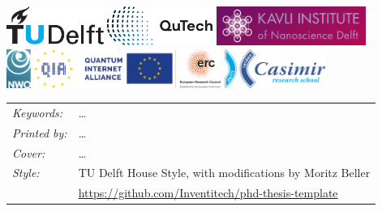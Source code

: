 \begin{titlepage}
\begin{center}
\noindent
\includegraphics[height=0.5in]{figures/logos/tudelft.pdf}
\hfill
\includegraphics[height=0.5in]{figures/logos/qutech.pdf}
\hfill
\includegraphics[height=0.5in]{figures/logos/kavli.pdf}
\\ \vspace{2\baselineskip}
\includegraphics[height=0.5in]{figures/logos/nwo.pdf}
\hfill
\includegraphics[height=0.5in]{figures/logos/qia.pdf}
\hfill
\includegraphics[height=0.5in]{figures/logos/erc.pdf}
\hfill
\includegraphics[height=0.5in]{figures/logos/casimir.pdf}
\end{center}

\vfill

\noindent
\begin{tabular}{@{}p{}@{}p{}}
    \textit{Keywords:} & \ldots \\[\medskipamount]
    \textit{Printed by:} & \ldots \\[\medskipamount]
    \textit{Cover:} & \ldots \\[\medskipamount]
    \textit{Style:} & TU Delft House Style, with modifications by Moritz Beller \\
    & \url{https://github.com/Inventitech/phd-thesis-template} \\[\medskipamount]
\end{tabular}


\end{titlepage}
